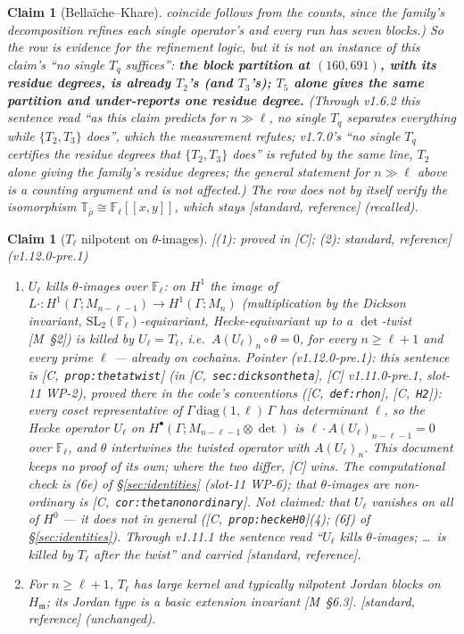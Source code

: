 \documentclass[11pt]{article}
\newtheorem{claim}[theorem]{Claim}
\theoremstyle{remark}
\newcommand{\F}{\mathbb{F}}
\newcommand{\SL}{\mathrm{SL}}
\newcommand{\Ga}{\Gamma}
\newcommand{\Fl}{\F_\ell}
\newcommand{\T}{\mathbb{T}}
\newcommand{\m}{\mathfrak{m}}
\newcommand{\Mn}{M_n}
\newcommand{\HA}[1]{[C,~\texttt{#1}]}      %
\newcommand{\Mnote}[1]{[M~\S#1]}            %
\newcommand{\STD}{\textsf{[standard, reference]}}
\begin{document}
\begin{claim}[Bella\"iche--Khare]
\emph{coincide} follows from the counts, since the family's decomposition refines each single
operator's and every run has seven blocks.) So the row is evidence for
the refinement logic, but it is \emph{not} an instance of this claim's ``no single $T_q$
suffices'': \textbf{the block partition at $(160,691)$, with its residue degrees, is already
$T_2$'s (and $T_3$'s); $T_5$ alone gives the same partition and under-reports one residue
degree.} (Through v1.6.2 this sentence read ``as
this claim predicts for $n\gg\ell$, no single $T_q$ separates everything while $\{T_2,T_3\}$
does'', which the measurement refutes; v1.7.0's ``no single $T_q$ certifies the residue degrees
that $\{T_2,T_3\}$ does'' is refuted by the same line, $T_2$ alone giving the family's residue
degrees; the general statement for $n\gg\ell$ above is a
counting argument and is not affected.) The row does not by itself verify the isomorphism
$\T_{\bar\rho}\cong\Fl[[x,y]]$, which stays \STD{} (recalled).
\end{claim}

\begin{claim}[$T_\ell$ nilpotent on $\theta$-images]\label{cl:Tlnil}\textsf{[(1): proved in [C]; (2): standard, reference]} (v1.12.0-pre.1)
\begin{enumerate}
\item $U_\ell$ kills $\theta$-images over $\Fl$: on $H^1$ the image of
  $L\cdot:H^1(\Ga;M_{n-\ell-1})\to H^1(\Ga;\Mn)$ (multiplication by the Dickson invariant,
  $\SL_2(\Fl)$-equivariant, Hecke-equivariant up to a $\det$-twist \Mnote{2}) is killed by
  $U_\ell=T_\ell$, i.e.\ $A(U_\ell)_n\circ\theta=0$, for every $n\ge\ell+1$ and every prime
  $\ell$ --- \emph{already on cochains}. \emph{Pointer} (v1.12.0-pre.1): this sentence is
  \HA{prop:thetatwist} (in \HA{sec:dicksontheta}, [C] v1.11.0-pre.1, slot-11 WP-2), proved there in
  the code's conventions (\HA{def:rhon}, \HA{H2}):
  every coset representative of $\Ga\,\mathrm{diag}(1,\ell)\,\Ga$ has determinant $\ell$, so the
  Hecke operator $U_\ell$ on $H^\bullet(\Ga;M_{n-\ell-1}\otimes\det)$ is $\ell\cdot A(U_\ell)_{n-\ell-1}=0$
  over $\Fl$, and $\theta$ intertwines the twisted operator with $A(U_\ell)_n$. This document keeps
  no proof of its own; where the two differ, [C] wins. The computational check is (6e) of
  \S\ref{sec:identities} (slot-11 WP-6); that $\theta$-images are non-ordinary is
  \HA{cor:thetanonordinary}. \emph{Not} claimed: that $U_\ell$ vanishes on all of $H^0$ ---
  it does not in general (\HA{prop:heckeH0}(4); (6f) of \S\ref{sec:identities}). \emph{Through
  v1.11.1} the sentence read ``$U_\ell$ kills
  $\theta$-images; \ldots\ is killed by $T_\ell$ after the twist'' and carried \STD.
\item For $n\ge\ell+1$, $T_\ell$ has large kernel and typically nilpotent Jordan blocks on
  $H_\m$; its Jordan type is a basic extension invariant \Mnote{6.3}. \STD{} (unchanged).
\end{enumerate}
\end{claim}
\end{document}
